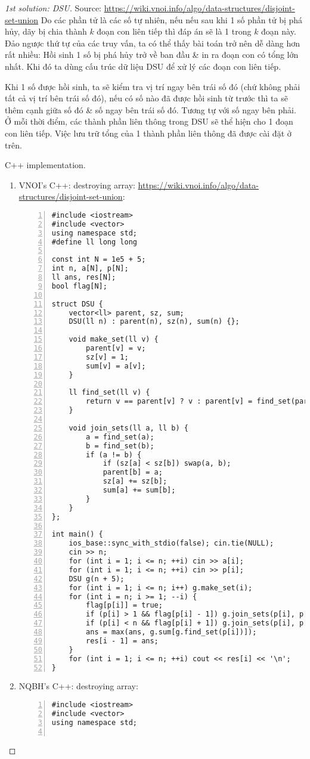\documentclass{article}
\begin{document}
\begin{proof}[1st solution: DSU]
    Source: \url{https://wiki.vnoi.info/algo/data-structures/disjoint-set-union} Do các phần tử là các số tự nhiên, nếu nếu sau khi 1 số phần tử bị phá hủy, dãy bị chia thành $k$ đoạn con liên tiếp thì đáp án sẽ là 1 trong $k$ đoạn này. Đảo ngược thứ tự của các truy vấn, ta có thể thấy bài toán trở nên dễ dàng hơn rất nhiều: Hồi sinh 1 số bị phá hủy trở về ban đầu \& in ra đoạn con có tổng lớn nhất. Khi đó ta dùng cấu trúc dữ liệu DSU để xử lý các đoạn con liên tiếp.

    Khi 1 số được hồi sinh, ta sẽ kiểm tra vị trí ngay bên trái số đó (chứ không phải tất cả vị trí bên trái số đó), nếu có số nào đã được hồi sinh từ trước thì ta sẽ thêm cạnh giữa số đó \& số ngay bên trái số đó. Tương tự với số ngay bên phải. Ở mỗi thời điểm, các thành phần liên thông trong DSU sẽ thể hiện cho 1 đoạn con liên tiếp. Việc lưu trữ tổng của 1 thành phần liên thông đã được cài đặt ở trên.
    \item {\sf C++ implementation.}
    \begin{enumerate}
        \item VNOI's C++: destroying array: \url{https://wiki.vnoi.info/algo/data-structures/disjoint-set-union}:
        \begin{Verbatim}[numbers=left,xleftmargin=5mm]
#include <iostream>
#include <vector>
using namespace std;
#define ll long long

const int N = 1e5 + 5;
int n, a[N], p[N];
ll ans, res[N];
bool flag[N];

struct DSU {
    vector<ll> parent, sz, sum;
    DSU(ll n) : parent(n), sz(n), sum(n) {};

    void make_set(ll v) {
        parent[v] = v;
        sz[v] = 1;
        sum[v] = a[v];
    }

    ll find_set(ll v) {
        return v == parent[v] ? v : parent[v] = find_set(parent[v]);
    }

    void join_sets(ll a, ll b) {
        a = find_set(a);
        b = find_set(b);
        if (a != b) {
            if (sz[a] < sz[b]) swap(a, b);
            parent[b] = a;
            sz[a] += sz[b];
            sum[a] += sum[b];
        }
    }
};

int main() {
    ios_base::sync_with_stdio(false); cin.tie(NULL);
    cin >> n;
    for (int i = 1; i <= n; ++i) cin >> a[i];
    for (int i = 1; i <= n; ++i) cin >> p[i];
    DSU g(n + 5);
    for (int i = 1; i <= n; i++) g.make_set(i);
    for (int i = n; i >= 1; --i) {
        flag[p[i]] = true;
        if (p[i] > 1 && flag[p[i] - 1]) g.join_sets(p[i], p[i] - 1);
        if (p[i] < n && flag[p[i] + 1]) g.join_sets(p[i], p[i] + 1);
        ans = max(ans, g.sum[g.find_set(p[i])]);
        res[i - 1] = ans;
    }
    for (int i = 1; i <= n; ++i) cout << res[i] << '\n';
}
        \end{Verbatim}
        \item NQBH's C++: destroying array:
        \begin{Verbatim}[numbers=left,xleftmargin=5mm]
#include <iostream>
#include <vector>
using namespace std;


\end{Verbatim}
\end{enumerate}
\end{proof}
\end{document}
